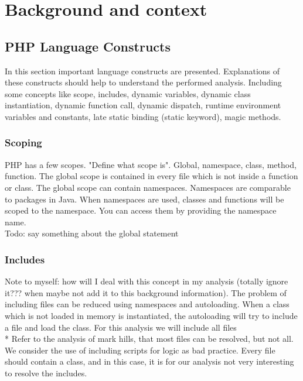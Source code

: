 \documentclass[../main.tex]{subfiles}
\begin{document}
    \chapter{Background and context}\label{chap:background}
    
    \section{PHP Language Constructs}
    In this section important language constructs are presented.
    Explanations of these constructs should help to understand the performed analysis.
    Including some concepts like scope, includes, dynamic variables, dynamic class instantiation, dynamic function call, dynamic dispatch, runtime environment variables and constants, late static binding (static keyword), magic methods.
    
    \subsection{Scoping}
    PHP has a few scopes. "Define what scope is".
    Global, namespace, class, method, function.
    The global scope is contained in every file which is not inside a function or class.
    The global scope can contain namespaces.
    Namespaces are comparable to packages in Java.
    When namespaces are used, classes and functions will be scoped to the namespace.
    You can access them by providing the namespace name.
    \\
    Todo: say something about the global statement
    
    \subsection{Includes}
    Note to myself: how will I deal with this concept in my analysis (totally ignore it??? when maybe not add it to this background information).
    The problem of including files can be reduced using namespaces and autoloading.
    When a class which is not loaded in memory is instantiated, the autoloading will try to include a file and load the class. 
    For this analysis we will include all files 
    \\
    * Refer to the analysis of mark hills, that most files can be resolved, but not all. 
    We consider the use of including scripts for logic as bad practice. 
    Every file should contain a class, and in this case, it is for our analysis not very interesting to resolve the includes.
    
\end{document}
